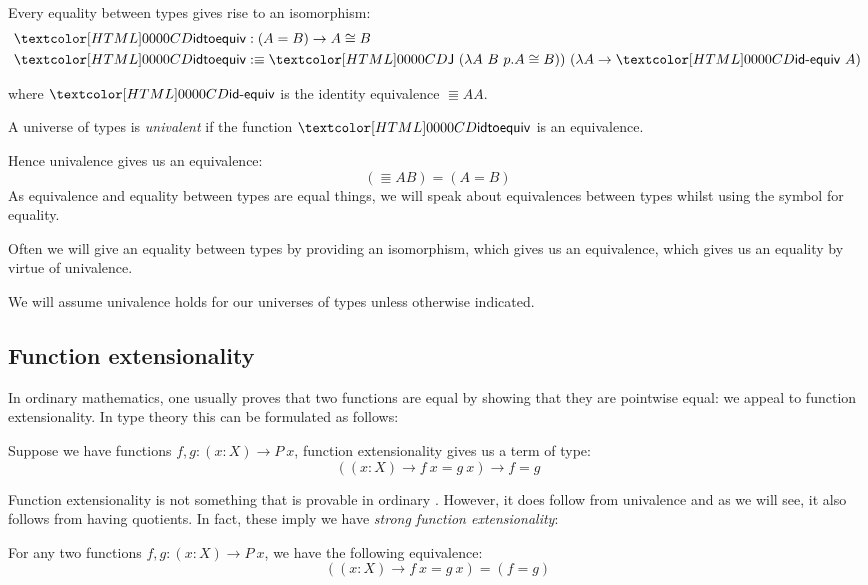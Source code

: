 \begin{definition}
  Every equality between types gives rise to an isomorphism:
  \begin{align*}
    &\idtoequiv : (A = B) \to \Equiv{A}{B} \\
    &\idtoequiv \ddefeq \J\ (\lambda A\ B\ p . \Equiv{A}{B}))\ (\lambda A \to \idequiv\ A)
  \end{align*}

  where $\idequiv$ is the identity equivalence $\Equiv{A}{A}$.
\end{definition}

\begin{definition}[Univalence]
  A universe of types is \emph{univalent} if the function $\idtoequiv$
  is an equivalence.
\end{definition}

Hence univalence gives us an equivalence:
$$
(\Equiv{A}{B}) = (A = B)
$$
As equivalence and equality between types are equal things, we will
speak about equivalences between types whilst using the symbol for
equality.

Often we will give an equality between types by providing an
isomorphism, which gives us an equivalence, which gives us an equality
by virtue of univalence.

We will assume univalence holds for our universes of types unless
otherwise indicated.

\subsection{Function extensionality}

In ordinary mathematics, one usually proves that two functions are
equal by showing that they are pointwise equal: we appeal to function
extensionality. In type theory this can be formulated as follows:
\begin{definition}
  Suppose we have functions $f, g : (x : X) \to P\ x$, function
  extensionality gives us a term of type:
  $$
  ((x : X) \to f\ x = g\ x) \to f = g
  $$
\end{definition}

Function extensionality is not something that is provable in ordinary
\mltt. However, it does follow from univalence and as we will see, it
also follows from having quotients. In fact, these imply we have \emph{strong function extensionality}:

\begin{proposition}
  For any two functions $f, g : (x : X) \to P\ x$, we have the following equivalence:
  $$
  ((x : X) \to f\ x = g\ x) = (f = g)
  $$
\end{proposition}

